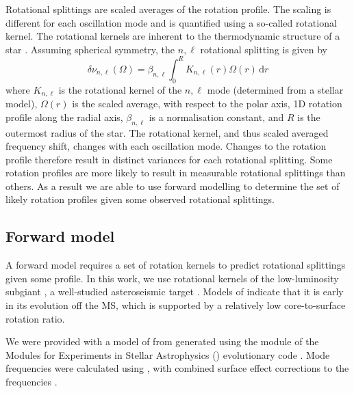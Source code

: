 Rotational splittings are scaled averages of the rotation profile. The scaling is different for each oscillation mode and is quantified using a so-called rotational kernel. The rotational kernels are inherent to the thermodynamic structure of a star \citep[see][for a derivation of these kernels]{aerts_asteroseismology_2010}. Assuming spherical symmetry, the $n,\ell$ rotational splitting is given by
   \begin{equation}
    \delta \nu_{n,\ell} (\Omega) = \beta_{n,\ell} \int^R_0 K_{n,\ell}(r) \Omega(r) \,\text{d}r
    \label{eqn:splitting}
\end{equation}
where $K_{n,\ell}$ is the rotational kernel of the $n,\ell$ mode (determined from a stellar model), $\Omega(r)$ is the scaled average, with respect to the polar axis, 1D rotation profile along the radial axis, $\beta_{n,\ell}$ is a normalisation constant, and $R$ is the outermost radius of the star. The rotational kernel, and thus scaled averaged frequency shift, changes with each oscillation mode. Changes to the rotation profile therefore result in distinct variances for each rotational splitting. Some rotation profiles are more likely to result in measurable rotational splittings than others. As a result we are able to use forward modelling to determine the set of likely rotation profiles given some observed rotational splittings.


\subsection{Forward model}
\label{sec:gen_mod}

A forward model requires a set of rotation kernels to predict rotational splittings given some profile. In this work, we use rotational kernels of the low-luminosity subgiant \thestar{}, a well-studied asteroseismic target \citep[e.g.,][]{deheuvels_seismic_2014}. Models of \thestar{} indicate that it is early in its evolution off the MS, which is supported by a relatively low core-to-surface rotation ratio.  

We were provided with a model of \thestar{} from \citet{ball_surface-effect_2017} generated using the  module of the Modules for Experiments in Stellar Astrophysics (\MESA{}) evolutionary code
\citep[r7624;][]{paxton_modules_2010,paxton_modules_2013,paxton_modules_2015,paxton_modules_2019}.
Mode frequencies were calculated using \ADIPLS{} \citep{christensen-dalsgaard_adipls_2008}, with combined surface effect corrections to the frequencies \citep{ball_new_2014, ball_surface-effect_2017}.

